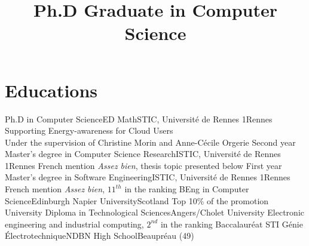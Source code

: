 \documentclass[11pt,a4paper]{moderncv}
\title{Ph.D Graduate in Computer Science}
\begin{document}
\makecvtitle

\section{Educations}
  {Ph.D in Computer Science}{ED MathSTIC, Université de Rennes 1}{Rennes}{}
	{Supporting Energy-awareness for Cloud Users\\Under the supervision of Christine Morin and Anne-Cécile Orgerie}
  {Second year Master’s degree in Computer Science Research}{ISTIC, Université de Rennes 1}{Rennes}{}
  {French mention \textit{Assez bien}, thesis topic presented below}
  {First year Master’s degree in Software Engineering}{ISTIC, Université de Rennes 1}{Rennes}{}
  {French mention \textit{Assez bien}, $11^{th}$ in the ranking}
  {BEng in Computer Science}{Edinburgh Napier University}{Scotland}{}
  {Top 10\% of the promotion}
  {University Diploma in Technological Sciences}{Angers/Cholet University}{}{}
	{Electronic engineering and industrial computing, $2^{nd}$ in the ranking}
  {Baccalauréat STI Génie Électrotechnique}{NDBN High School}{Beaupréau (49)}{}{}



\end{document}
